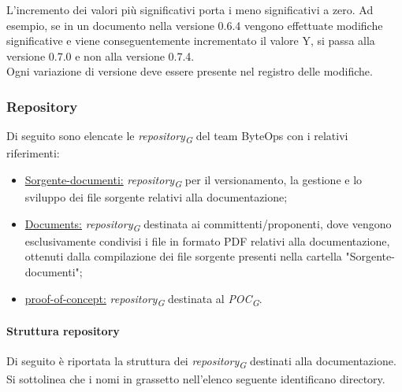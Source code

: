 L'incremento dei valori più significativi porta i meno significativi a zero. Ad esempio, se in un documento nella versione 0.6.4 vengono effettuate modifiche significative e viene conseguentemente incrementato il valore Y, si passa alla versione 0.7.0 e non alla versione 0.7.4. \\
Ogni variazione di versione deve essere presente nel registro delle modifiche.

\subsubsection{Repository}
Di seguito sono elencate le \textit{repository}\textsubscript{\textit{G}} del team ByteOps con i relativi riferimenti:
\begin{itemize}
    \item \href{https://github.com/ByteOps-swe/Sorgente-documenti}{Sorgente-documenti:} \textit{repository}\textsubscript{\textit{G}} per il versionamento, la gestione e lo sviluppo dei file sorgente relativi alla documentazione;
    \item \href{https://github.com/ByteOps-swe/Documents}{Documents:} \textit{repository}\textsubscript{\textit{G}} destinata ai committenti/proponenti, dove vengono esclusivamente condivisi i file in formato PDF relativi alla documentazione, ottenuti dalla compilazione dei file sorgente presenti nella cartella "Sorgente-documenti";
    \item \href{https://github.com/ByteOps-swe/proof-of-concept}{proof-of-concept:} \textit{repository}\textsubscript{\textit{G}} destinata al \textit{POC}\textsubscript{\textit{G}}.
\end{itemize}
\paragraph{Struttura repository}
Di seguito è riportata la struttura dei \textit{repository}\textsubscript{\textit{G}} destinati alla documentazione. Si sottolinea che i nomi in grassetto nell'elenco seguente identificano directory.

